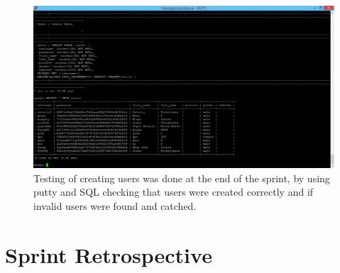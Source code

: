 \begin{figure}[ht!]
\centering
\includegraphics[width={\linewidth}]{Sprint2/img/Sprint2-testing.png}
\caption{ Testing of creating users was done at the end of the sprint, by using putty and SQL checking that users were created correctly and if invalid users were found and catched. \label{overflow}}
\end{figure}

\section{Sprint Retrospective} 
\label{sec:S2Retrospective}


